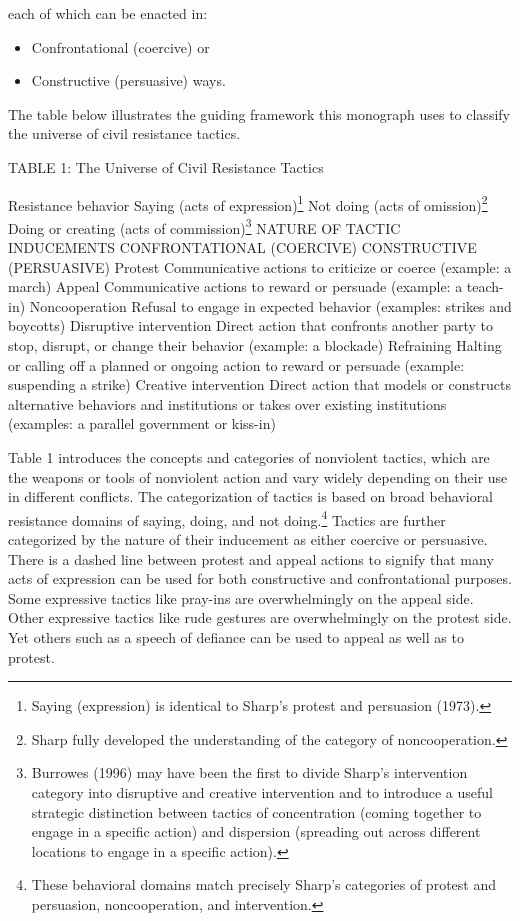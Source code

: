 \documentclass[twoside,a4paper,12pt,fleqn,openany]{extbook}
\begin{document}
each of which can be enacted in:

\begin{itemize}
\item Confrontational (coercive) or
\item Constructive (persuasive) ways.
\end{itemize}

The table below illustrates the guiding framework this monograph uses to classify the universe of civil resistance tactics.

TABLE 1: The Universe of Civil Resistance Tactics

Resistance behavior
Saying (acts of expression)\footnote{Saying (expression) is identical to Sharp’s protest and persuasion (1973).}
Not doing (acts of omission)\footnote{Sharp fully developed the understanding of the category of noncooperation.}
Doing or creating (acts of commission)\footnote{Burrowes (1996) may have been the first to divide Sharp’s intervention category into disruptive and creative intervention and to introduce a useful strategic distinction between tactics of concentration (coming together to engage in a specific action) and dispersion (spreading out across different locations to engage in a specific action).}
NATURE OF TACTIC INDUCEMENTS
CONFRONTATIONAL (COERCIVE)
CONSTRUCTIVE (PERSUASIVE)
Protest
Communicative actions to criticize or coerce (example: a march)
Appeal
Communicative actions to reward or persuade (example: a teach-in)
Noncooperation
Refusal to engage in expected behavior (examples: strikes and boycotts)
Disruptive intervention
Direct action that confronts another party to stop, disrupt, or change their behavior (example: a blockade)
Refraining
Halting or calling off a planned or ongoing action to reward or persuade (example: suspending a strike)
Creative intervention
Direct action that models or constructs alternative behaviors and institutions or takes over existing institutions (examples: a parallel government or kiss-in)

Table 1 introduces the concepts and categories of nonviolent tactics, which are the weapons or tools of nonviolent action and vary widely depending on their use in different conflicts. The categorization of tactics is based on broad behavioral resistance domains of saying, doing, and not doing.\footnote{These behavioral domains match precisely Sharp’s categories of protest and persuasion, noncooperation, and intervention.} Tactics are further categorized by the nature of their inducement as either coercive or persuasive. There is a dashed line between protest and appeal actions to signify that many acts of expression can be used for both constructive and confrontational purposes. Some expressive tactics like pray-ins are overwhelmingly on the appeal side. Other expressive tactics like rude gestures are overwhelmingly on the protest side. Yet others such as a speech of defiance can be used to appeal as well as to protest.
\end{document}
